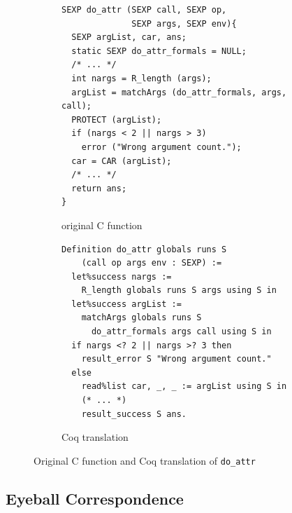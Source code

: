 \documentclass[
    sigplan,
    10pt,
    review, %
    natbib=false %
 ]{acmart}
\newcommand\et[1]{\todo[color=blue!20,size=\scriptsize]{#1}}
\begin{document}
\begin{figure}[t]
    \centering{}
\begin{subfigure}{.54\textwidth}
\begin{verbatim}
SEXP do_attr (SEXP call, SEXP op,
              SEXP args, SEXP env){
  SEXP argList, car, ans;
  static SEXP do_attr_formals = NULL;
  /* ... */
  int nargs = R_length (args);
  argList = matchArgs (do_attr_formals, args, call);
  PROTECT (argList);
  if (nargs < 2 || nargs > 3)
    error ("Wrong argument count.");
  car = CAR (argList);
  /* ... */
  return ans;
}
\end{verbatim}
\vspace{-0.5em}
    \caption{original C function}
    \label{fig:c:do_attr}
\end{subfigure}
\begin{subfigure}{.45\textwidth}
\begin{verbatim}
Definition do_attr globals runs S
    (call op args env : SEXP) :=
  let%success nargs :=
    R_length globals runs S args using S in
  let%success argList :=
    matchArgs globals runs S
      do_attr_formals args call using S in
  if nargs <? 2 || nargs >? 3 then
    result_error S "Wrong argument count."
  else
    read%list car, _, _ := argList using S in
    (* ... *)
    result_success S ans.
\end{verbatim}
\vspace{-0.5em}
    \caption{Coq translation}
    \label{fig:coq:do_attr}
\end{subfigure}
\vspace{-1em}
    \caption{Original C function and Coq translation of \texttt{do_attr}}
    \label{fig:do_attr}
\end{figure}

\subsection{Eyeball Correspondence}
\label{sec:eyeball:closeness}


\end{document}
